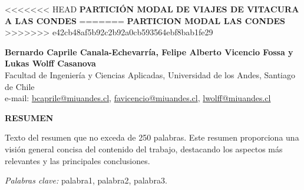 \documentclass[letterpaper,12pt]{article}
\begin{document}
\begin{titlepage}
    \centering
    \vspace*{1cm}

<<<<<<< HEAD
    \textbf{\Large PARTICIÓN MODAL DE VIAJES DE VITACURA A LAS CONDES}
=======
    \textbf{\Large PARTICION MODAL LAS CONDES}
>>>>>>> e42cb48af5b92c2b92a0cb593564ebf8bab1fe29
    
    \vspace{1cm}
    
    \textbf{Bernardo Caprile Canala-Echevarría, Felipe Alberto Vicencio Fossa y Lukas Wolff Casanova}\\
    Facultad de Ingeniería y Ciencias Aplicadas, Universidad de los Andes, Santiago de Chile\\
    e-mail: \href{mailto:bcaprile@miuandes.cl}{bcaprile@miuandes.cl}, \href{mailto:favicencio@miuandes.cl}{favicencio@miuandes.cl}, \href{mailto:lwolff@miuandes.cl}{lwolff@miuandes.cl}
    
    \vspace{2cm}
    
    \textbf{RESUMEN}
    
    \vspace{0.5cm}
    
    Texto del resumen que no exceda de 250 palabras. Este resumen proporciona una visión general concisa del contenido del trabajo, destacando los aspectos más relevantes y las principales conclusiones.

    \vspace{1cm}
    
    \textit{Palabras clave:} palabra1, palabra2, palabra3.
    
\end{titlepage}

\newpage






\end{document}
